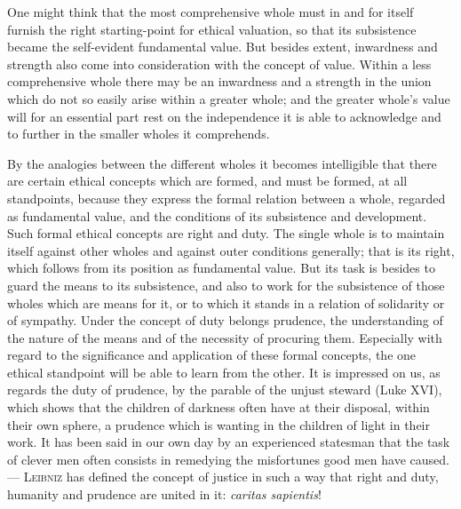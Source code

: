 \documentclass[12pt]{book}
\newcommand{\opage}[1]{\marginnote{\footnotesize\textit{[#1]}}}
\begin{document}
One might think that the most comprehensive whole must in and for itself furnish
the right starting-point for ethical valuation, so that its subsistence became the
self-evident fundamental value. But besides extent, inwardness and strength also
come into consideration with the concept of value. Within a less comprehensive
whole there may be an inwardness and a strength in the union which do not so
easily \opage{123}arise within a greater whole; and the greater whole's value will for an
essential part rest on the independence it is able to acknowledge and to further
in the smaller wholes it comprehends.

By the analogies between the different wholes it becomes intelligible that there
are certain ethical concepts which are formed, and must be formed, at all
standpoints, because they express the formal relation between a whole, regarded
as fundamental value, and the conditions of its subsistence and development. Such
formal ethical concepts are right and duty. The single whole is to maintain itself
against other wholes and against outer conditions generally; that is its right,
which follows from its position as fundamental value. But its task is besides to
guard the means to its subsistence, and also to work for the subsistence of those
wholes which are means for it, or to which it stands in a relation of solidarity
or of sympathy. Under the concept of duty belongs prudence, the understanding of
the nature of the means and of the necessity of procuring them. Especially with
regard to the significance and application of these formal concepts, the one
ethical standpoint will be able to learn from the other. It is impressed on us, as
regards the duty of prudence, by the parable of the unjust steward (Luke XVI),
which shows that the children of darkness often have at their disposal, within
their own sphere, a prudence which is wanting in the children of light in their
work. It has been said in our own day by an experienced statesman that the task of
clever men often consists in remedying the misfortunes good men have caused. ---
\textsc{Leibniz} has defined the concept of justice in such a way that right and
duty, humanity and prudence are united in it: \textit{caritas sapientis}!
\end{document}

